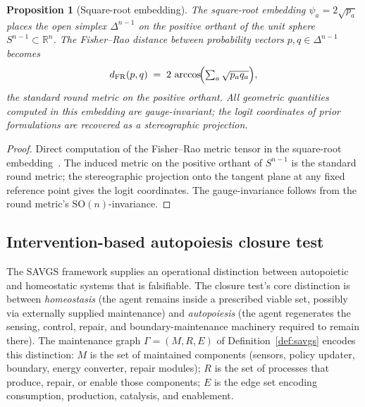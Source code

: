 \documentclass[11pt,a4paper]{article}
\theoremstyle{plain}
\newtheorem{proposition}[theorem]{Proposition}
\theoremstyle{definition}
\theoremstyle{remark}
\newcommand{\RR}{\mathbb{R}}
\newcommand{\SO}{\mathrm{SO}}
\begin{document}
\begin{proposition}[Square-root embedding]\label{prop:sqrt}
The square-root embedding $\psi_a = 2\sqrt{p_a}$ places the open simplex
$\Delta^{n-1}$ on the positive orthant of the unit sphere
$S^{n-1}\subset\RR^n$. The Fisher--Rao distance between probability
vectors $p,q\in\Delta^{n-1}$ becomes
\begin{equation}\label{eq:fr}
  d_{\mathrm{FR}}(p,q) \;=\; 2\,\arccos\!\Bigl(\textstyle\sum_a\sqrt{p_a q_a}\Bigr),
\end{equation}
the standard round metric on the positive orthant. All geometric
quantities computed in this embedding are gauge-invariant; the logit
coordinates of prior formulations are recovered as a stereographic
projection.
\end{proposition}

\begin{proof}
Direct computation of the Fisher--Rao metric tensor in the square-root
embedding~\cite{bhattacharyya1943,amari2000}. The induced metric on the
positive orthant of $S^{n-1}$ is the standard round metric; the
stereographic projection onto the tangent plane at any fixed reference
point gives the logit coordinates. The gauge-invariance follows from
the round metric's $\SO(n)$-invariance.
\end{proof}

\subsection{Intervention-based autopoiesis closure test}

\label{sec:kappa-closure}
The SAVGS framework supplies an operational distinction between
autopoietic and homeostatic systems that is falsifiable. The closure test's core distinction is between \emph{homeostasis} (the agent remains
inside a prescribed viable set, possibly via externally supplied
maintenance) and \emph{autopoiesis} (the agent regenerates the sensing,
control, repair, and boundary-maintenance machinery required to remain
there). The maintenance graph $\Gamma = (M, R, E)$ of
Definition~\ref{def:savgs} encodes this distinction: $M$ is the set of
maintained components (sensors, policy updater, boundary, energy
converter, repair modules); $R$ is the set of processes that produce,
repair, or enable those components; $E$ is the edge set encoding
consumption, production, catalysis, and enablement.
\end{document}
